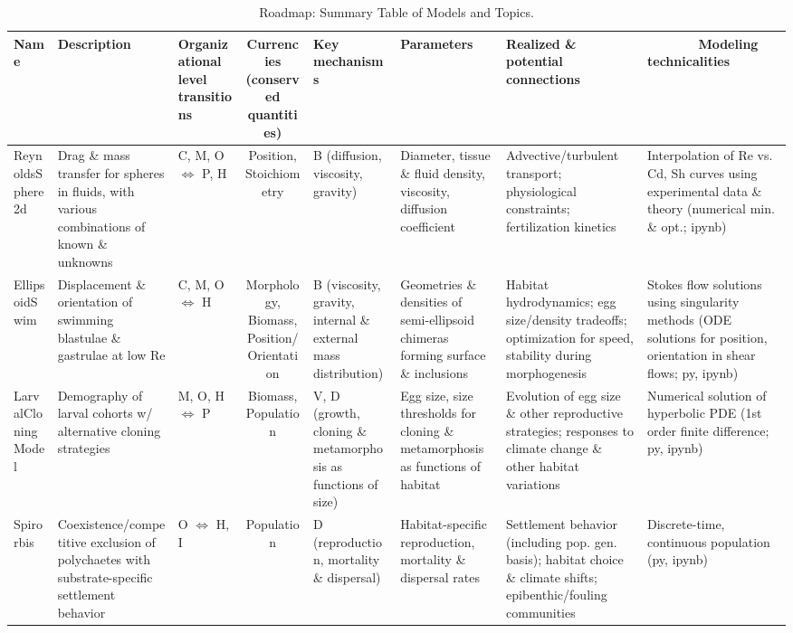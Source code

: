 \documentclass[10pt,legalpaper]{article}
\begin{document}
	
\begin{sidewaystable}
	\centering
	\caption{Roadmap: Summary Table of Models and Topics.} \label{tab:rmap}
	\vspace{.25cm}
	\small
	\begin{tabular}{|l|L|I|S|I|I|I|I|}
		\hline
		Name & \centering Description & \centering Organizational level transitions & Currencies (conserved quantities) & \centering Key mechanisms & \centering Parameters & \centering Realized \& potential connections & ~~~~~~~Modeling technicalities \\
		\hline
		ReynoldsSphere2d & Drag \& mass transfer for spheres in fluids, with various combinations of known \& unknowns & C, M, O $\Leftrightarrow$ P, H & Position, Stoichiometry & B (diffusion, viscosity, gravity) & Diameter, tissue \& fluid density, viscosity, diffusion coefficient & Advective/turbulent transport; physiological constraints; fertilization kinetics & Interpolation of Re vs. Cd, Sh curves using experimental data \& theory (numerical min. \& opt.; ipynb) \\
		
		EllipsoidSwim & Displacement \& orientation of swimming blastulae \& gastrulae at low Re & C, M, O $\Leftrightarrow$ H & Morphology, Biomass, Position/Orientation & B (viscosity, gravity, internal \& external mass distribution) & Geometries \& densities of semi-ellipsoid chimeras forming surface \& inclusions & Habitat hydrodynamics; egg size/density tradeoffs; optimization for speed, stability during morphogenesis & Stokes flow solutions using singularity methods (ODE solutions for position, orientation in shear flows; py, ipynb) \\
		
		LarvalCloningModel & Demography of larval cohorts w/ alternative cloning strategies & M, O, H $\Leftrightarrow$ P & Biomass, Population & V, D (growth, cloning \& metamorphosis as functions of size) & Egg size, size thresholds for cloning \& metamorphosis as functions of habitat & Evolution of egg size \& other reproductive strategies; responses to climate change \& other habitat variations & Numerical solution of hyperbolic PDE (1st order finite difference; py, ipynb) \\
		
		Spirorbis & Coexistence/competitive exclusion of polychaetes with substrate-specific settlement behavior  & O $\Leftrightarrow$ H, I & Population & D (reproduction, mortality \& dispersal) & Habitat-specific reproduction, mortality \& dispersal rates & Settlement behavior (including pop. gen. basis); habitat choice \& climate shifts; epibenthic/fouling communities & Discrete-time, continuous population (py, ipynb) \\
		

\end{tabular}
\end{sidewaystable}
\end{document}
